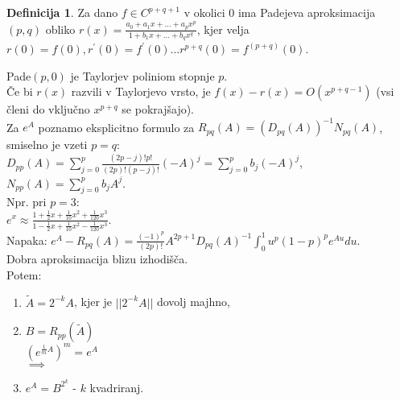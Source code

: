 \documentclass[a4paper, 12pt]{book}
\theoremstyle{definition}
\newtheorem{defn}[counter]{Definicija}
\theoremstyle{remark}
\begin{document}
\begin{defn}
    Za dano $f \in C^{p+q+1}$ v okolici $0$ ima Padejeva aproksimacija $(p,q)$ obliko
    $r(x) = \frac{a_0 + a_1 x + \dots + a_p x^p}{1 + b_1 x + \dots + b_q x^q}$, kjer velja \\
    $r(0) = f(0), r^{'}(0) = f^{'}(0) \dots r^{p+q}(0) = f^{(p+q)}(0)$.
\end{defn}
Pade$(p,0)$ je Taylorjev poliniom stopnje $p$. \\
Če bi $r(x)$ razvili v Taylorjevo vrsto, je $f(x) - r(x) = O\left( x^{p+q-1} \right)$
(vsi členi do vključno $x^{p+q}$ se pokrajšajo). \\
Za $e^A$ poznamo eksplicitno formulo za $R_{pq}(A) = (D_{pq}(A))^{-1} N_{pq}(A)$,
smiselno je vzeti $p = q$: \\
$D_{pp}(A) = \sum_{j=0}^{p} \frac{(2p-j)! p!}{(2p)! (p-j)!} (-A)^j = \sum_{j=0}^{p} b_j (-A)^j$, \\
$N_{pp}(A) = \sum_{j=0}^p b_j A^j$. \\
Npr. pri $p=3$: \\
$e^x \approx \frac{1 + \frac{1}{2} x + \frac{1}{10} x^2 + \frac{1}{120} x^3}
    {1 - \frac{1}{2} x + \frac{1}{10} x^2 - \frac{1}{120} x^3}$. \\
Napaka: $e^A - R_{pq}(A) = \frac{(-1)^p}{(2p)!} A^{2p+1} D_{pq}(A)^{-1} \int_0^1 u^p (1-p)^p e^{Au} du$. \\
Dobra aproksimacija blizu izhodišča. \\
Potem:
\begin{enumerate}[label=\arabic*)]
    \item $\widetilde{A} = 2^{-k} A$, kjer je $|| 2^{-k} A ||$ dovolj majhno,
    \item $B = R_{pp}\left(\widetilde{A}\right)$ \\
        $\left(e^{\frac{1}{m} A}\right)^m = e^A$ \\
        $\implies$
    \item $e^A = B^{2^k}$ - $k$ kvadriranj.
\end{enumerate}




%
%



\end{document}

